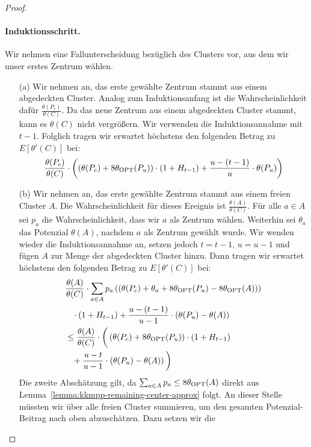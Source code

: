 \begin{proof}
	\paragraph{Induktionsschritt.} Wir nehmen eine Fallunterscheidung bezüglich des Clusters vor, aus dem wir unser erstes
	Zentrum wählen.
	\begin{enumerate}
		\item[(a)] 	Wir nehmen an, das erste gewählte Zentrum stammt aus einem abgedeckten Cluster. Analog zum Induktionsanfang
					ist die Wahrscheinlichkeit dafür $\frac{\theta(P_c)}{\theta(C)}$. Da das neue Zentrum aus einem abgedeckten
					Cluster stammt, kann es $\theta(C)$ nicht vergrößern. Wir verwenden die Induktionsannahme mit $t-1$.
					Folglich tragen wir erwartet höchstens den folgenden Betrag zu $E[\theta'(C)]$ bei:
					\[ \frac{\theta(P_c)}{\theta(C)} \cdot \left( \left( \theta(P_c) + 8 \theta_{\textrm{OPT}}(P_u) \right)
						\cdot (1 + H_{t-1}) + \frac{u - (t-1)}{u} \cdot \theta(P_u) \right) \]
		\item[(b)] 	Wir nehmen an, das erste gewählte Zentrum stammt aus einem freien Cluster $A$. Die
					Wahrscheinlichkeit für dieses Ereignis ist $\frac{\theta(A)}{\theta(C)}$. Für alle $a \in A$ sei
					$p_a$ die Wahrscheinlichkeit, dass wir $a$ als Zentrum wählen. Weiterhin sei $\theta_a$ das Potenzial
					$\theta(A)$, nachdem $a$ als Zentrum gewählt wurde. Wir wenden wieder die Induktionsannahme an, setzen
					jedoch $t = t-1$, $u = u-1$ und fügen $A$ zur Menge der abgedeckten Cluster hinzu. Dann tragen wir
					erwartet höchstens den folgenden Betrag zu $E[\theta'(C)]$ bei:
					\begin{align*}
						& \frac{\theta(A)}{\theta(C)} \cdot \sum_{a \in A} p_a \left(
							\left( \theta(P_c) + \theta_a + 8 \theta_{\textrm{OPT}}(P_u) - 8 \theta_{\textrm{OPT}}(A) \right)
							\right) \\
						& \; \; \; \cdot (1 + H_{t-1}) + \frac{u - (t-1)}{u-1} \cdot \left(
							\theta(P_u) - \theta(A) \right) \\
						&\leq \frac{\theta(A)}{\theta(C)} \cdot \bigg( \left( \theta(P_c) + 8 \theta_{\textrm{OPT}}(P_u) \right)
							\cdot (1 + H_{t-1}) \\
						& \; \; \; + \frac{u-t}{u-1} \cdot \left( \theta(P_u) - \theta(A) \right) \bigg)
					\end{align*}
					Die zweite Abschätzung gilt, da $\sum_{a \in A} p_a \leq 8 \theta_{\textrm{OPT}}(A)$ direkt aus
					Lemma~\ref{lemma:kkmpp-remaining-center-approx} folgt. An dieser Stelle müssten wir über alle freien
					Cluster summieren, um den gesamten Potenzial-Beitrag nach oben abzuschätzen. Dazu setzen wir die

\end{enumerate}
\end{proof}
